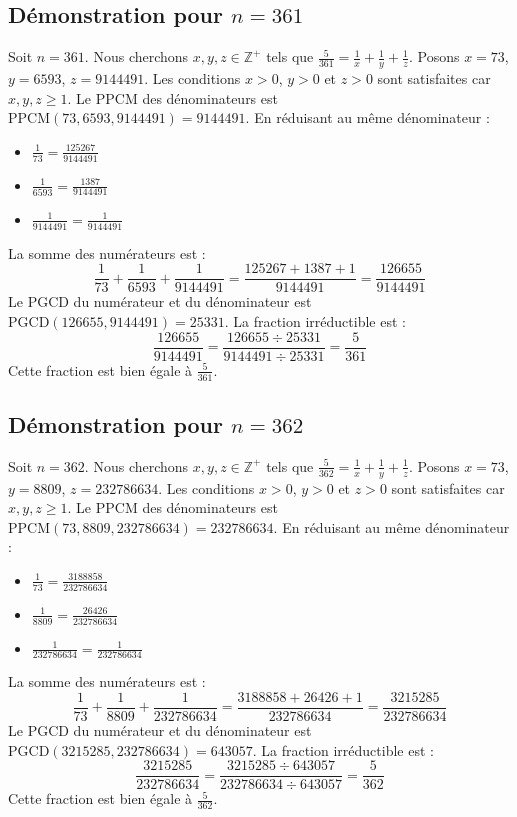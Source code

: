 \documentclass[11pt,a4paper]{article}
\begin{document}
\subsection{Démonstration pour $n = 361$}
Soit $n = 361$. Nous cherchons $x, y, z \in \mathbb{Z}^{+}$ tels que $\frac{5}{361} = \frac{1}{x} + \frac{1}{y} + \frac{1}{z}$.
Posons $x = 73$, $y = 6593$, $z = 9144491$.
Les conditions $x > 0$, $y > 0$ et $z > 0$ sont satisfaites car $x, y, z \geq 1$.
Le PPCM des dénominateurs est $\text{PPCM}(73, 6593, 9144491) = 9144491$.
En réduisant au même dénominateur :
\begin{itemize}
    \item $\frac{1}{73} = \frac{125267}{9144491}$
    \item $\frac{1}{6593} = \frac{1387}{9144491}$
    \item $\frac{1}{9144491} = \frac{1}{9144491}$
\end{itemize}
La somme des numérateurs est :
$$ \frac{1}{73} + \frac{1}{6593} + \frac{1}{9144491} = \frac{125267 + 1387 + 1}{9144491} = \frac{126655}{9144491} $$
Le PGCD du numérateur et du dénominateur est $\text{PGCD}(126655, 9144491) = 25331$.
La fraction irréductible est :
$$ \frac{126655}{9144491} = \frac{126655 \div 25331}{9144491 \div 25331} = \frac{5}{361} $$
Cette fraction est bien égale à $\frac{5}{361}$.

\subsection{Démonstration pour $n = 362$}
Soit $n = 362$. Nous cherchons $x, y, z \in \mathbb{Z}^{+}$ tels que $\frac{5}{362} = \frac{1}{x} + \frac{1}{y} + \frac{1}{z}$.
Posons $x = 73$, $y = 8809$, $z = 232786634$.
Les conditions $x > 0$, $y > 0$ et $z > 0$ sont satisfaites car $x, y, z \geq 1$.
Le PPCM des dénominateurs est $\text{PPCM}(73, 8809, 232786634) = 232786634$.
En réduisant au même dénominateur :
\begin{itemize}
    \item $\frac{1}{73} = \frac{3188858}{232786634}$
    \item $\frac{1}{8809} = \frac{26426}{232786634}$
    \item $\frac{1}{232786634} = \frac{1}{232786634}$
\end{itemize}
La somme des numérateurs est :
$$ \frac{1}{73} + \frac{1}{8809} + \frac{1}{232786634} = \frac{3188858 + 26426 + 1}{232786634} = \frac{3215285}{232786634} $$
Le PGCD du numérateur et du dénominateur est $\text{PGCD}(3215285, 232786634) = 643057$.
La fraction irréductible est :
$$ \frac{3215285}{232786634} = \frac{3215285 \div 643057}{232786634 \div 643057} = \frac{5}{362} $$
Cette fraction est bien égale à $\frac{5}{362}$.
\end{document}

